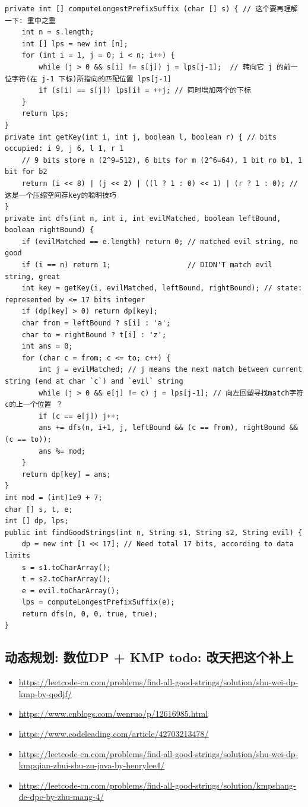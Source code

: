 \documentclass[9pt, b5paaper]{book}
\begin{document}
\begin{verbatim}
private int [] computeLongestPrefixSuffix (char [] s) { // 这个要再理解一下: 重中之重
    int n = s.length;
    int [] lps = new int [n];
    for (int i = 1, j = 0; i < n; i++) {
        while (j > 0 && s[i] != s[j]) j = lps[j-1];  // 转向它 j 的前一位字符(在 j-1 下标)所指向的匹配位置 lps[j-1]
        if (s[i] == s[j]) lps[i] = ++j; // 同时增加两个的下标     
    }
    return lps;
}
private int getKey(int i, int j, boolean l, boolean r) { // bits occupied: i 9, j 6, l 1, r 1
    // 9 bits store n (2^9=512), 6 bits for m (2^6=64), 1 bit ro b1, 1 bit for b2
    return (i << 8) | (j << 2) | ((l ? 1 : 0) << 1) | (r ? 1 : 0); // 这是一个压缩空间存key的聪明技巧
} 
private int dfs(int n, int i, int evilMatched, boolean leftBound, boolean rightBound) {
    if (evilMatched == e.length) return 0; // matched evil string, no good
    if (i == n) return 1;                  // DIDN'T match evil string, great
    int key = getKey(i, evilMatched, leftBound, rightBound); // state: represented by <= 17 bits integer
    if (dp[key] > 0) return dp[key];
    char from = leftBound ? s[i] : 'a';
    char to = rightBound ? t[i] : 'z';
    int ans = 0;
    for (char c = from; c <= to; c++) { 
        int j = evilMatched; // j means the next match between current string (end at char `c`) and `evil` string
        while (j > 0 && e[j] != c) j = lps[j-1]; // 向左回塑寻找match字符c的上一个位置 ？
        if (c == e[j]) j++;
        ans += dfs(n, i+1, j, leftBound && (c == from), rightBound && (c == to));
        ans %= mod;
    }
    return dp[key] = ans;
}
int mod = (int)1e9 + 7;
char [] s, t, e;
int [] dp, lps;
public int findGoodStrings(int n, String s1, String s2, String evil) {
    dp = new int [1 << 17]; // Need total 17 bits, according to data limits
    s = s1.toCharArray();
    t = s2.toCharArray();
    e = evil.toCharArray();
    lps = computeLongestPrefixSuffix(e);
    return dfs(n, 0, 0, true, true);
}
\end{verbatim}
\subsection{动态规划: 数位DP + KMP todo: 改天把这个补上}
\label{sec-15-3-2}
\begin{itemize}
\item \url{https://leetcode-cn.com/problems/find-all-good-strings/solution/shu-wei-dp-kmp-by-qodjf/}
\item \url{https://www.cnblogs.com/wenruo/p/12616985.html}
\item \url{https://www.codeleading.com/article/42703213478/}
\item \url{https://leetcode-cn.com/problems/find-all-good-strings/solution/shu-wei-dp-kmpqian-zhui-shu-zu-java-by-henrylee4/}
\item \url{https://leetcode-cn.com/problems/find-all-good-strings/solution/kmpshang-de-dpc-by-zhu-mang-4/}
\end{itemize}
\end{document}
